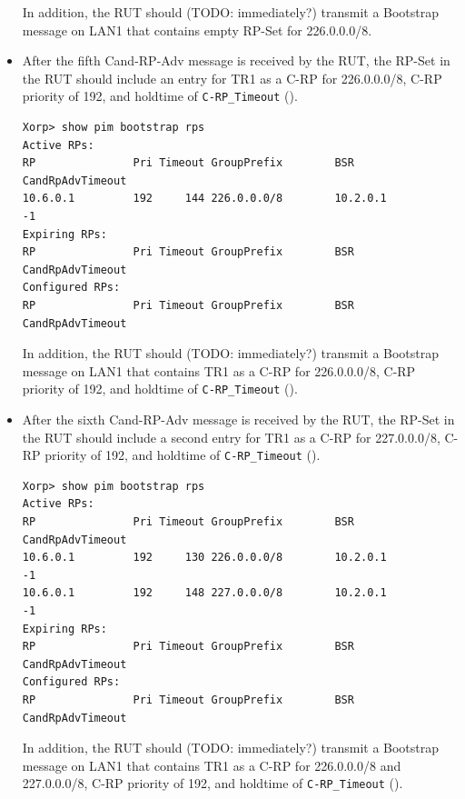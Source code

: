 \documentclass[11pt]{report}
\begin{document}
\begin{itemize}
  In addition, the RUT should (TODO: immediately?) transmit a Bootstrap
  message on LAN1 that contains empty RP-Set for 226.0.0.0/8.

  \item After the fifth Cand-RP-Adv message is received by the RUT, the RP-Set
  in the RUT should include an entry for TR1 as a C-RP for 226.0.0.0/8,
  C-RP priority of 192, and holdtime of \verb=C-RP_Timeout=
  ({\PimsmCRPTimeout}).

\begin{verbatim}
Xorp> show pim bootstrap rps 
Active RPs:
RP               Pri Timeout GroupPrefix        BSR         CandRpAdvTimeout
10.6.0.1         192     144 226.0.0.0/8        10.2.0.1                  -1
Expiring RPs:
RP               Pri Timeout GroupPrefix        BSR         CandRpAdvTimeout
Configured RPs:
RP               Pri Timeout GroupPrefix        BSR         CandRpAdvTimeout
\end{verbatim}

  In addition, the RUT should (TODO: immediately?) transmit a Bootstrap
  message on LAN1 that contains TR1 as a C-RP for 226.0.0.0/8,
  C-RP priority of 192, and holdtime of \verb=C-RP_Timeout=
  ({\PimsmCRPTimeout}).

  \item After the sixth Cand-RP-Adv message is received by the RUT, the RP-Set
  in the RUT should include a second entry for TR1 as a C-RP for 227.0.0.0/8,
  C-RP priority of 192, and holdtime of \verb=C-RP_Timeout=
  ({\PimsmCRPTimeout}).

\begin{verbatim}
Xorp> show pim bootstrap rps 
Active RPs:
RP               Pri Timeout GroupPrefix        BSR         CandRpAdvTimeout
10.6.0.1         192     130 226.0.0.0/8        10.2.0.1                  -1
10.6.0.1         192     148 227.0.0.0/8        10.2.0.1                  -1
Expiring RPs:
RP               Pri Timeout GroupPrefix        BSR         CandRpAdvTimeout
Configured RPs:
RP               Pri Timeout GroupPrefix        BSR         CandRpAdvTimeout
\end{verbatim}

  In addition, the RUT should (TODO: immediately?) transmit a Bootstrap
  message on LAN1 that contains TR1 as a C-RP for 226.0.0.0/8 and 227.0.0.0/8,
  C-RP priority of 192, and holdtime of \verb=C-RP_Timeout=
  ({\PimsmCRPTimeout}).

\end{itemize}

\end{document}
